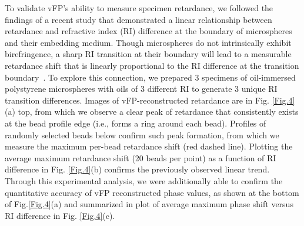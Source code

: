 \documentclass{article}
\begin{document}
To validate vFP's ability to measure specimen retardance, we followed the findings of a recent study \cite{guo2020revealing} that demonstrated a linear relationship between retardance and refractive index (RI) difference at the boundary of microspheres and their embedding medium. Though microspheres do not intrinsically exhibit birefringence, a sharp RI transition at their boundary will lead to a measurable retardance shift that is linearly proportional to the RI difference at the transition boundary~\cite{oldenbourg1991analysis}. To explore this connection, we prepared 3 specimens of oil-immersed polystyrene microspheres with oils of 3 different RI to generate 3 unique RI transition differences. Images of vFP-reconstructed retardance are in Fig. \ref{Fig.4}(a) top, from which we observe a clear peak of retardance that consistently exists at the bead profile edge (i.e., forms a ring around each bead). Profiles of randomly selected beads below confirm such peak formation, from which we measure the maximum per-bead retardance shift (red dashed line). Plotting the average maximum retardance shift (20 beads per point) as a function of RI difference in Fig. \ref{Fig.4}(b) confirms the previously observed linear trend. Through this experimental analysis, we were additionally able to confirm the quantitative accuracy of vFP reconstructed phase values, as shown at the bottom of Fig.\ref{Fig.4}(a) and summarized in plot of average maximum phase shift versus RI difference in Fig. \ref{Fig.4}(c). 
\end{document}

